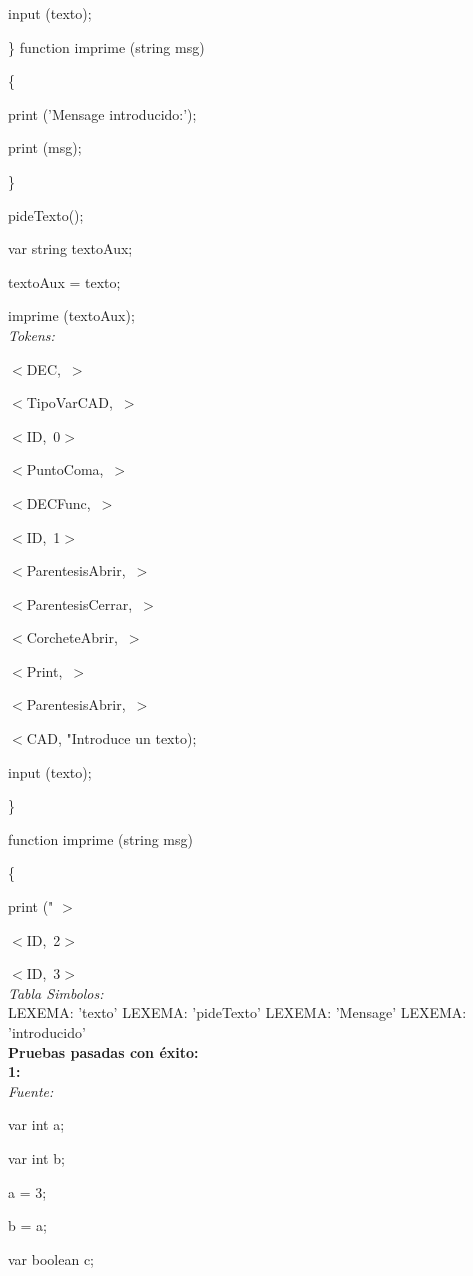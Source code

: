 \documentclass[a4paper, 12pt]{article}
\begin{document}
	input (texto);
	
\}
function imprime (string msg)

\{

	print ('Mensage introducido:');
	
	print (msg);
	
\}

pideTexto();

var string textoAux;

textoAux = texto;

imprime (textoAux);\medskip\\
\emph{Tokens:}


 \mbox{$<$DEC, $>$} 
 
 
 \mbox{$<$TipoVarCAD, $>$ }
 
 
 \mbox{$<$ID, 0$>$ }
 
 
 \mbox{$<$PuntoComa, $>$ }
 
 
 \mbox{$<$DECFunc, $>$ }
 
 
 \mbox{$<$ID, 1$>$ }
 
 
 \mbox{$<$ParentesisAbrir, $>$ }
 
 
 \mbox{$<$ParentesisCerrar, $>$}
 
  
 \mbox{$<$CorcheteAbrir, $>$ }
 
 
 \mbox{$<$Print, $>$ }

 \mbox{$<$ParentesisAbrir, $>$ }

$<$CAD, "\textnormal{Introduce un texto);} 
 
	input (texto);
	
\} 

\textnormal{function imprime (string msg)}

\{ 

	print (" $>$
	
	
\mbox{$<$ID, 2$>$ }


\mbox{$<$ID, 3$>$}\medskip\\


\emph{Tabla Simbolos:}\\
  LEXEMA: 'texto'
  LEXEMA: 'pideTexto'
  LEXEMA: 'Mensage'
  LEXEMA: 'introducido'\bigskip \\
\textbf{Pruebas pasadas con éxito:}\medskip\\
\textbf{1:}\smallskip\\
\emph{Fuente:} \smallskip


var int a;
 
var int b;

a = 3;

b = a;

 var boolean c;
 
\end{document}
